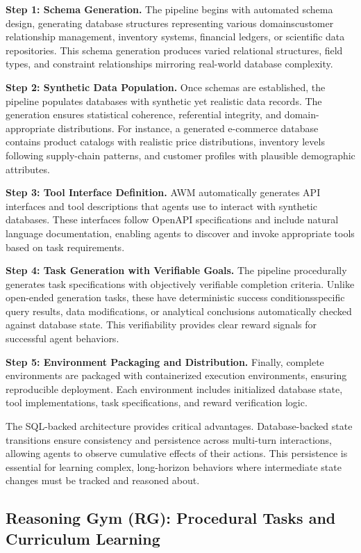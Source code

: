 \textbf{Step 1: Schema Generation.} The pipeline begins with automated schema design, generating database structures representing various domainscustomer relationship management, inventory systems, financial ledgers, or scientific data repositories. This schema generation produces varied relational structures, field types, and constraint relationships mirroring real-world database complexity.

\textbf{Step 2: Synthetic Data Population.} Once schemas are established, the pipeline populates databases with synthetic yet realistic data records. The generation ensures statistical coherence, referential integrity, and domain-appropriate distributions. For instance, a generated e-commerce database contains product catalogs with realistic price distributions, inventory levels following supply-chain patterns, and customer profiles with plausible demographic attributes.

\textbf{Step 3: Tool Interface Definition.} AWM automatically generates API interfaces and tool descriptions that agents use to interact with synthetic databases. These interfaces follow OpenAPI specifications and include natural language documentation, enabling agents to discover and invoke appropriate tools based on task requirements.

\textbf{Step 4: Task Generation with Verifiable Goals.} The pipeline procedurally generates task specifications with objectively verifiable completion criteria. Unlike open-ended generation tasks, these have deterministic success conditionsspecific query results, data modifications, or analytical conclusions automatically checked against database state. This verifiability provides clear reward signals for successful agent behaviors.

\textbf{Step 5: Environment Packaging and Distribution.} Finally, complete environments are packaged with containerized execution environments, ensuring reproducible deployment. Each environment includes initialized database state, tool implementations, task specifications, and reward verification logic.

The SQL-backed architecture provides critical advantages. Database-backed state transitions ensure consistency and persistence across multi-turn interactions, allowing agents to observe cumulative effects of their actions. This persistence is essential for learning complex, long-horizon behaviors where intermediate state changes must be tracked and reasoned about.

\subsection{Reasoning Gym (RG): Procedural Tasks and Curriculum Learning}

